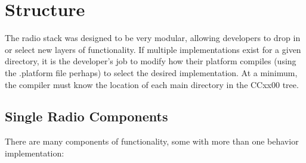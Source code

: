 \documentclass{article}
\begin{document}
\section{Structure}
\label{sec:structure}
The radio stack was designed to be very modular, allowing developers to drop in or select new
layers of functionality. If multiple implementations exist for a given directory, it 
is the developer's job to modify how their platform compiles (using the .platform file
perhaps) to select the desired implementation. At a minimum, the compiler must know the location of each main directory
in the CCxx00 tree.

\subsection{Single Radio Components}
\label{sec:singleradiocomponents}
There are many components of functionality, some with more than one behavior implementation:
\end{document}
